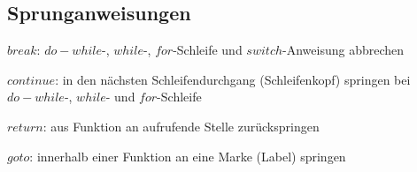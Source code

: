 	\subsection{Sprunganweisungen }
		\begin{compactitem}
			\item $break$: $do-while$-, $while$-,  $for$-Schleife und $switch$-Anweisung abbrechen
			\item $continue$: in den nächsten Schleifendurchgang (Schleifenkopf) springen bei $do-while$-, $while$- und $for$-Schleife 
			\item $return$: aus Funktion an aufrufende Stelle zurückspringen
			\item $goto$: innerhalb einer Funktion an eine Marke (Label) springen
		\end{compactitem}